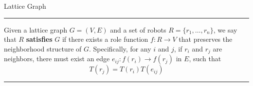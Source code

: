 \documentclass[10pt]{beamer}
\newcommand{\edge}[3]{{#1}\overset{#2}{\longrightarrow}{#3}}
\begin{document}
\begin{frame}{Lattice Graph}
  \hrule
  \begin{bclogo}[noborder=true, logo=\bccrayon]{} 
    Given a lattice graph $G=(V, E)$ and a set of robots $R = \{
    r_1, \ldots, r_n \}$, we say that $R$ \textbf{satisfies} $G$ if
    there exists a role function $f: R \rightarrow V$ that preserves
    the neighborhood structure of $G$.
    Specifically, for any $i$ and $j$, if $r_i$ and $r_j$ are neighbors, 
    there must exist an edge
    $e_{ij}: \edge{f(r_i)}{}{f(r_j)}$ in $E$, such that
    $$ T(r_j) = T(r_i) T(e_{ij})$$
  \end{bclogo}
  \hrule 
  \begin{columns}[T] 
    \begin{column}{.5\textwidth}

    \end{column}%
    \begin{column}{.5\textwidth}
      \begin{figure}
        \centering
        
      \end{figure}
    \end{column}%
  \end{columns}
\end{frame}
\end{document}
